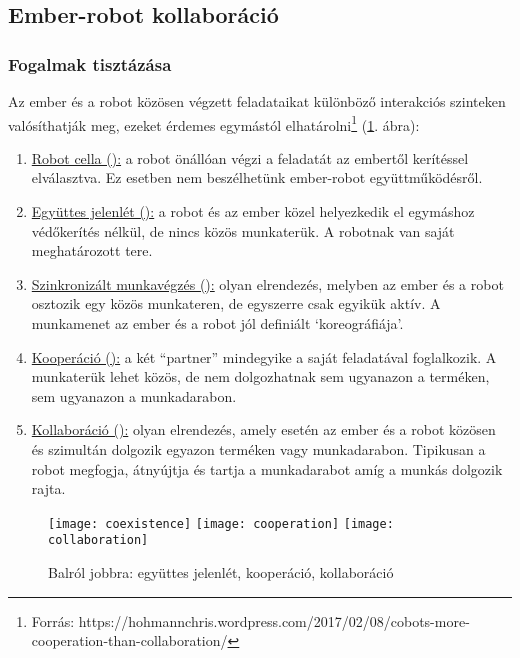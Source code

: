 \documentclass[../documentation.tex]{subfiles}
\begin{document}
\subsection{Ember-robot kollaboráció}
\subsubsection{Fogalmak tisztázása}
Az ember és a robot közösen végzett feladataikat különböző interakciós szinteken valósíthatják meg, ezeket érdemes egymástól elhatárolni\footnote{Forrás: https://hohmannchris.wordpress.com/2017/02/08/cobots-more-cooperation-than-collaboration/} (\ref{fig:coex-coop-collab}. ábra):
\begin{enumerate}
	\item \underline{Robot cella ():} a robot önállóan végzi a feladatát az embertől kerítéssel elválasztva. Ez esetben nem beszélhetünk ember-robot együttműködésről.
	\item \underline{Együttes jelenlét ():} a robot és az ember közel helyezkedik el egymáshoz védőkerítés nélkül, de nincs közös munkaterük. A robotnak van saját meghatározott tere.
	\item \underline{Szinkronizált munkavégzés ():} olyan elrendezés, melyben az ember és a robot osztozik egy közös munkateren, de egyszerre csak egyikük aktív. A munkamenet az ember és a robot jól definiált `koreográfiája'.
	\item \underline{Kooperáció ():} a két ``partner'' mindegyike a saját feladatával foglalkozik. A munkaterük lehet közös, de nem dolgozhatnak sem ugyanazon a terméken, sem ugyanazon a munkadarabon.
	\item \underline{Kollaboráció ():} olyan elrendezés, amely esetén az ember és a robot közösen és szimultán dolgozik egyazon terméken vagy munkadarabon. Tipikusan a robot megfogja, átnyújtja és tartja a munkadarabot amíg a munkás dolgozik rajta.
\end{enumerate}

\begin{figure}[h]
	\centering
	\texttt{[image: coexistence]}
	\texttt{[image: cooperation]}
	\texttt{[image: collaboration]}
	\caption[Caption for LOF]{Balról jobbra: együttes jelenlét, kooperáció, kollaboráció\footnotemark}
	\label{fig:coex-coop-collab}
\end{figure}

\end{document}
